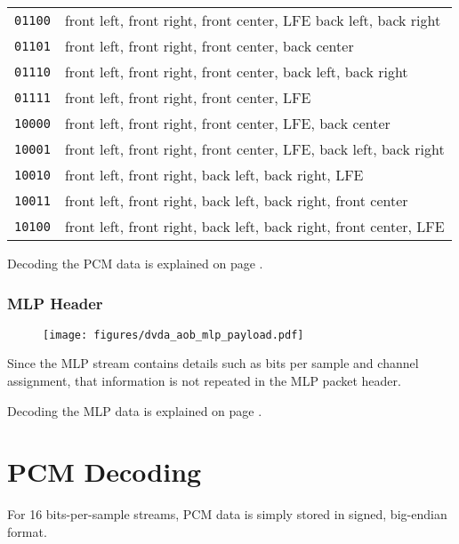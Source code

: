 \begin{table}[h]
{{\begin{tabular}{|c|l|}
\texttt{01100} & front left, front right, front center, LFE back left, back right \\
\texttt{01101} & front left, front right, front center, back center \\
\texttt{01110} & front left, front right, front center, back left, back right \\
\texttt{01111} & front left, front right, front center, LFE \\
\texttt{10000} & front left, front right, front center, LFE, back center \\
\texttt{10001} & front left, front right, front center, LFE, back left, back right \\
\texttt{10010} & front left, front right, back left, back right, LFE \\
\texttt{10011} & front left, front right, back left, back right, front center \\
\texttt{10100} & front left, front right, back left, back right, front center, LFE \\
\hline
\end{tabular}
}
}
\end{table}
\par
\noindent

Decoding the PCM data is explained on page \pageref{aob_pcm}.

\clearpage

\subsubsection{MLP Header}

\begin{figure}[h]
\texttt{[image: figures/dvda\_aob\_mlp\_payload.pdf]}
\end{figure}
\par
\noindent
Since the MLP stream contains details such as bits per sample
and channel assignment, that information is not repeated in the MLP
packet header.

Decoding the MLP data is explained on page \pageref{aob_mlp}.

\clearpage

\section{PCM Decoding}
\label{aob_pcm}

For 16 bits-per-sample streams, PCM data is simply stored in
signed, big-endian format.

